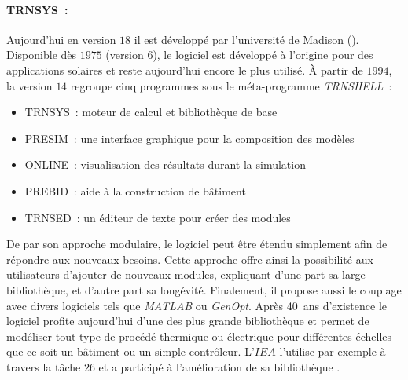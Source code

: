 \paragraph{TRNSYS~:} %
\label{par:trnssys}
Aujourd’hui en version $18$ \parencite{Klein2017} il est développé par l’université de Madison ().
Disponible dès $1975$ (version $6$), le logiciel est développé à l’origine pour des applications
solaires et reste aujourd’hui encore le plus utilisé. À partir de $1994$, la version
$14$ regroupe cinq programmes sous le méta-programme \textit{TRNSHELL}~:
\begin{itemize}
    \item TRNSYS~: moteur de calcul et bibliothèque de base
    \item PRESIM~: une interface graphique pour la composition des modèles
    \item ONLINE~: visualisation des résultats durant la simulation
    \item PREBID~: aide à la construction de bâtiment
    \item TRNSED~: un éditeur de texte pour créer des modules
\end{itemize}
De par son approche modulaire, le logiciel peut être étendu simplement afin de répondre aux
nouveaux besoins. Cette approche offre ainsi la possibilité aux utilisateurs
d’ajouter de nouveaux modules, expliquant d’une part sa large bibliothèque, et d’autre part
sa longévité. Finalement, il propose aussi le couplage avec divers logiciels tels que
\textit{MATLAB} ou \textit{GenOpt}. Après \SI{40}{ans} d’existence le logiciel profite aujourd’hui
d’une des plus grande bibliothèque et permet de modéliser tout type de procédé thermique ou
électrique pour différentes échelles que ce soit un bâtiment ou un simple contrôleur.
L’$IEA$ l’utilise par exemple à travers la tâche $26$ et a participé à l’amélioration de
sa bibliothèque \parencite{Task26B2002}.

